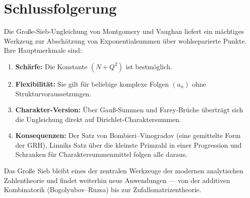 \documentclass[12pt,a4paper]{amsart}
\theoremstyle{definition}
\begin{document}
\section{Schlussfolgerung}

Die Große-Sieb-Ungleichung von Montgomery und Vaughan liefert ein mächtiges
Werkzeug zur Abschätzung von Exponentialsummen über wohlseparierte Punkte.
Ihre Hauptmerkmale sind:

\begin{enumerate}
  \item \textbf{Schärfe:} Die Konstante $(N + Q^2)$ ist bestmöglich.
  \item \textbf{Flexibilität:} Sie gilt für beliebige komplexe Folgen $(a_n)$
    ohne Strukturvoraussetzungen.
  \item \textbf{Charakter-Version:} Über Gauß-Summen und Farey-Brüche
    überträgt sich die Ungleichung direkt auf Dirichlet-Charaktersummen.
  \item \textbf{Konsequenzen:} Der Satz von Bombieri--Vinogradov (eine
    gemittelte Form der GRH), Linniks Satz über die kleinste Primzahl in
    einer Progression und Schranken für Charaktersummenmittel folgen alle
    daraus.
\end{enumerate}

Das Große Sieb bleibt eines der zentralen Werkzeuge der modernen analytischen
Zahlentheorie und findet weiterhin neue Anwendungen --- von der additiven
Kombinatorik (Bogolyubov--Ruzsa) bis zur Zufallsmatrizentheorie.
\end{document}
